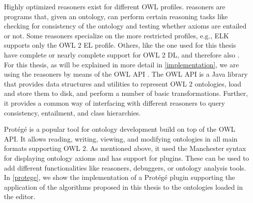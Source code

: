 Highly optimized reasoners exist for different OWL profiles. reasoners are programs that, given an ontology, can perform certain reasoning tasks like checking for consistency of the ontology and testing whether axioms are entailed or not. Some reasoners specialize on the more restricted profiles, e.g., ELK \cite{kazakov2014elk} supports only the OWL 2 EL profile. Others, like the one used for this thesis have complete or nearly complete support for OWL 2 DL, and therefore also \SROIQ. For this thesis, as will be explained in more detail in \cref{implementation}, we are using the reasoners by means of the OWL API \cite{horridge2011owl}. The OWL API is a Java library that provides data structures and utilities to represent OWL 2 ontologies, load and store them to disk, and perform a number of basic transformations. Further, it provides a common way of interfacing with different reasoners to query consistency, entailment, and class hierarchies.

Protégé \cite{musen2015protege} is a popular tool for ontology development build on top of the OWL API. It allows reading, writing, viewing, and modifying ontologies in all main formats supporting OWL 2. As mentioned above, it used the Manchester syntax for displaying ontology axioms and has support for plugins. These can be used to add different functionalities like reasoners, debuggers, or ontology analysis tools. In \cref{protege}, we show the implementation of a Protégé plugin supporting the application of the algorithms proposed in this thesis to the ontologies loaded in the editor.

